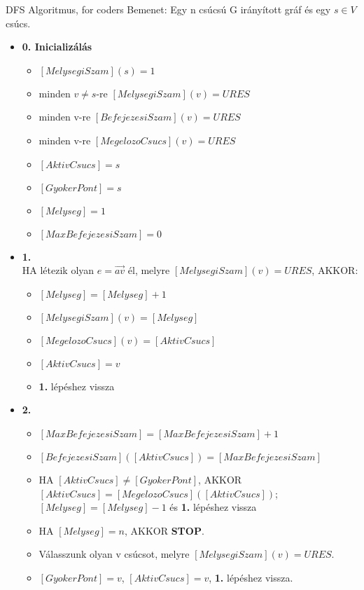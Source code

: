\begin{tetel}{DFS Algoritmus, for coders}
Bemenet: Egy n csúcsú G irányított gráf és egy $s \in V$ csúcs.
\begin{itemize}
\item{\textbf{0. Inicializálás}}
  \begin{itemize}
  \item $[MelysegiSzam](s) = 1$
  \item minden $v \neq s$-re $[MelysegiSzam](v) = URES$
  \item minden v-re $[BefejezesiSzam](v) = URES$
  \item minden v-re $[MegelozoCsucs](v) = URES$
  \item $[AktivCsucs]=s$
  \item $[GyokerPont] = s$
  \item $[Melyseg] = 1$
  \item $[MaxBefejezesiSzam] = 0$
  \end{itemize}
\item{\textbf{1.}}
\\
HA létezik olyan $e = \overrightarrow{av}$ él, melyre $[MelysegiSzam](v) = URES$, AKKOR:
	\begin{itemize}
	\item $[Melyseg] = [Melyseg] + 1$
	\item $[MelysegiSzam](v) = [Melyseg]$
	\item $[MegelozoCsucs](v) = [AktivCsucs]$
	\item $[AktivCsucs] = v$
	\item \textbf{1.} lépéshez vissza
	\end{itemize}
\item{\textbf{2.}}
	\begin{itemize}
	\item $[MaxBefejezesiSzam] = [MaxBefejezesiSzam] + 1$
	\item $[BefejezesiSzam]([AktivCsucs]) = [MaxBefejezesiSzam]$
	\item HA $[AktivCsucs] \neq [GyokerPont]$, AKKOR $[AktivCsucs] = [MegelozoCsucs]([AktivCsucs])$; $[Melyseg] = [Melyseg] - 1$ és \textbf{1.} lépéshez vissza
	\item HA $[Melyseg] = n$, AKKOR \textbf{STOP}.
	\item Válasszunk olyan v csúcsot, melyre $[MelysegiSzam](v) = URES$.
	\item $[GyokerPont] = v$, $[AktivCsucs] = v$, \textbf{1.} lépéshez vissza.
	\end{itemize}
\end{itemize}
\end{tetel}


